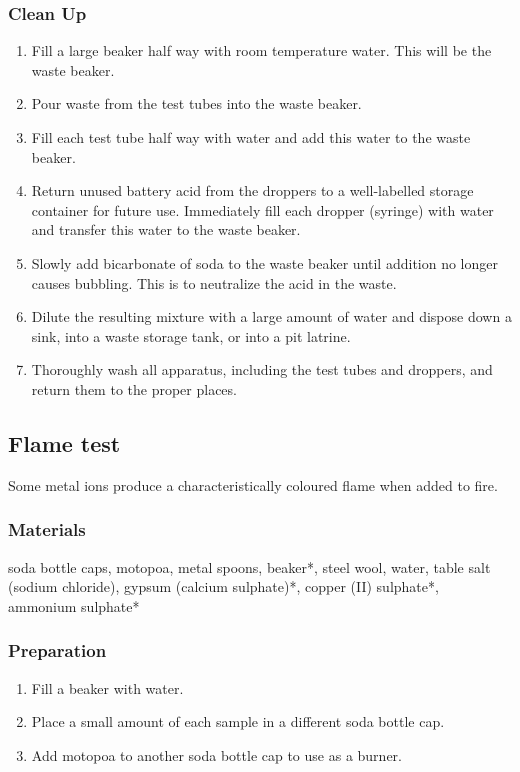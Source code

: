 \subsubsection{Clean Up}
\begin{enumerate}
\item{Fill a large beaker half way with room temperature water. This will be the waste beaker.}
\item{Pour waste from the test tubes into the waste beaker.}
\item{Fill each test tube half way with water and add this water to the waste beaker.}
\item{Return unused battery acid from the droppers to a well-labelled storage container for future use. Immediately fill each dropper (syringe) with water and transfer this water to the waste beaker.}
\item{Slowly add bicarbonate of soda to the waste beaker until addition no longer causes bubbling. This is to neutralize the acid in the waste.}
\item{Dilute the resulting mixture with a large amount of water and dispose down a sink, into a waste storage tank, or into a pit latrine.}
\item{Thoroughly wash all apparatus, including the test tubes and droppers, and return them to the proper places.}
\end{enumerate}

\subsection{Flame test}

Some metal ions produce a characteristically coloured flame when added to fire.

\subsubsection{Materials}
soda bottle caps, motopoa, metal spoons, beaker*, steel wool, water, table salt (sodium chloride), gypsum (calcium sulphate)*, copper (II) sulphate*, ammonium sulphate*

\subsubsection{Preparation}
\begin{enumerate}
\item{Fill a beaker with water.}
\item{Place a small amount of each sample in a different soda bottle cap.}
\item{Add motopoa to another soda bottle cap to use as a burner.}
\end{enumerate}


